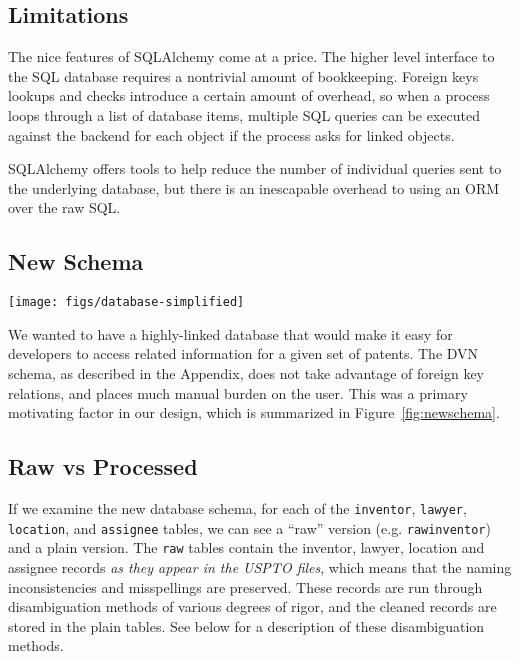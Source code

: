 \subsection{Limitations}

The nice features of SQLAlchemy come at a price. The higher level
interface to the SQL database requires a nontrivial amount of bookkeeping.
Foreign keys lookups and checks introduce a certain amount of overhead,
so when a process loops through a list of database items, multiple
SQL queries can be executed against the backend for each object if
the process asks for linked objects.

SQLAlchemy offers tools to help reduce the number of individual queries
sent to the underlying database, but there is an inescapable overhead
to using an ORM over the raw SQL.


\subsection{New Schema}

\begin{figure*}
\center \texttt{[image: figs/database-simplified]}
\caption{High level view of new database schema}


\label{fig:newschema} 
\end{figure*}


We wanted to have a highly-linked database that would make it easy
for developers to access related information for a given set of patents.
The DVN schema, as described in the Appendix, does not take advantage
of foreign key relations, and places much manual burden on the user.
This was a primary motivating factor in our design, which is summarized
in Figure~\ref{fig:newschema}.


\subsection{Raw vs Processed}

If we examine the new database schema, for each of the \verb`inventor`,
\verb`lawyer`, \verb`location`, and \verb`assignee` tables, we
can see a ``raw'' version (e.g. \verb`rawinventor`) and a plain
version. The \verb`raw` tables contain the inventor, lawyer, location
and assignee records \emph{as they appear in the USPTO files}, which
means that the naming inconsistencies and misspellings are preserved.
These records are run through disambiguation methods of various degrees
of rigor, and the cleaned records are stored in the plain tables.
See below for a description of these disambiguation methods.

